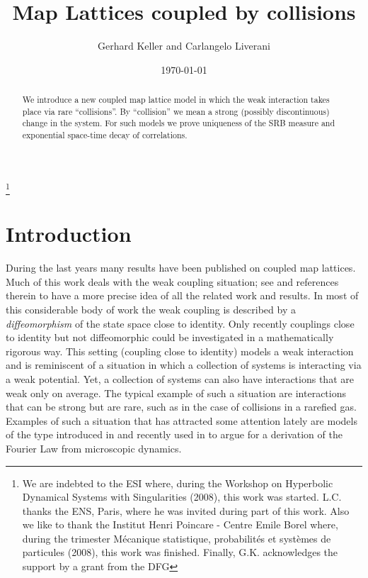 \documentclass{amsart}
\numberwithin{equation}{section}
\begin{document}
\title[Map lattices with collisions]{Map Lattices coupled by collisions}
\author{Gerhard Keller and Carlangelo Liverani}
\address{Gerhard Keller\\Department Mathematik\\Universit\"at
  Erlangen-N\"urnberg\\Bismarckstr. 1$\frac12$, 91052 Erlangen, Germany}
\address{Carlangelo Liverani\\
Dipartimento di Matematica\\
II Universit\`{a} di Roma (Tor Vergata)\\
Via della Ricerca Scientifica, 00133 Roma, Italy.}
\date{\today}
\begin{abstract}
  We introduce a new coupled map lattice model in which the weak interaction
  takes place via rare ``collisions''. By ``collision'' we mean a strong
  (possibly discontinuous) change in the system. For such models we prove
  uniqueness of the SRB measure and exponential space-time decay of
  correlations.
\end{abstract}
\thanks{We are indebted to the ESI where, during the Workshop on Hyperbolic
  Dynamical Systems with Singularities (2008), this work was started. L.C. thanks the ENS, Paris, where he was invited during part of this work. Also we like to thank the Institut Henri Poincare - Centre Emile Borel where, during the trimester M\'ecanique statistique, probabilit\'es et syst\`emes de particules (2008), this work was finished. Finally, G.K. acknowledges the support by a grant from the DFG}
\maketitle
\section{Introduction}
During the last years many results have been published on coupled map
lattices. Much of this work deals with the weak coupling situation; see
\cite{book} and references therein to have a more precise idea of all the
related work and results. In most of this considerable body of work the weak
coupling is described by a \emph{diffeomorphism} of the state space close to
identity. Only recently couplings close to identity but not diffeomorphic
could be investigated in a mathematically rigorous way. This setting (coupling
close to identity) models a weak interaction and is reminiscent of a situation
in which a collection of systems is interacting via a weak potential. Yet, a
collection of systems can also have interactions that are weak only on
average. The typical example of such a situation are interactions that can be
strong but are rare, such as in the case of collisions in a rarefied gas.
Examples of such a situation that has attracted some attention lately are
models of the type introduced in \cite{liverani-bunimovich-p-s} and recently
used in \cite{gaspard-gilbert1, gaspard-gilbert2} to argue for a derivation of
the Fourier Law from microscopic dynamics.
\end{document}
